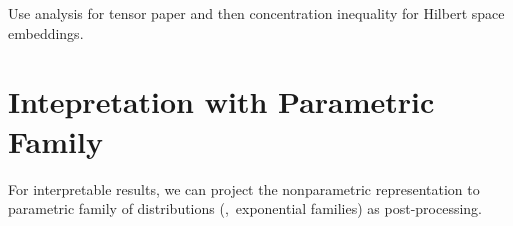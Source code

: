 \documentclass[11pt]{article}
\begin{document}
Use analysis for tensor paper and then concentration inequality for Hilbert space embeddings.

\section{Intepretation with Parametric Family}

For interpretable results, we can project the nonparametric representation to parametric family of distributions (\eg,~exponential families) as post-processing.


\end{document}

